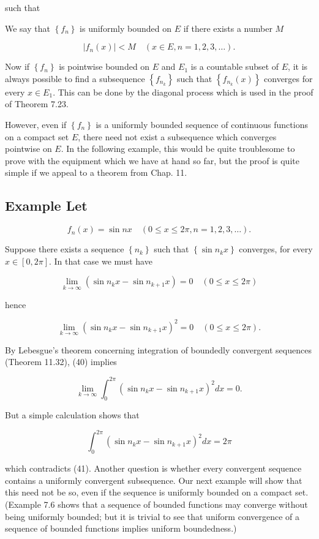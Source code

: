 \documentclass[10pt]{article}
\begin{document}
such that

We say that $\left\{f_{n}\right\}$ is uniformly bounded on $E$ if there exists a number $M$

$$
\left|f_{n}(x)\right|<M \quad(x \in E, n=1,2,3, \ldots) .
$$

Now if $\left\{f_{n}\right\}$ is pointwise bounded on $E$ and $E_{1}$ is a countable subset of $E$, it is always possible to find a subsequence $\left\{f_{n_{k}}\right\}$ such that $\left\{f_{n_{k}}(x)\right\}$ converges for every $x \in E_{1}$. This can be done by the diagonal process which is used in the proof of Theorem 7.23.

However, even if $\left\{f_{n}\right\}$ is a uniformly bounded sequence of continuous functions on a compact set $E$, there need not exist a subsequence which converges pointwise on $E$. In the following example, this would be quite troublesome to prove with the equipment which we have at hand so far, but the proof is quite simple if we appeal to a theorem from Chap. 11.

\subsection{Example Let}
$$
f_{n}(x)=\sin n x \quad(0 \leq x \leq 2 \pi, n=1,2,3, \ldots) .
$$

Suppose there exists a sequence $\left\{n_{k}\right\}$ such that $\left\{\sin n_{k} x\right\}$ converges, for every $x \in[0,2 \pi]$. In that case we must have

$$
\lim _{k \rightarrow \infty}\left(\sin n_{k} x-\sin n_{k+1} x\right)=0 \quad(0 \leq x \leq 2 \pi)
$$

hence

$$
\lim _{k \rightarrow \infty}\left(\sin n_{k} x-\sin n_{k+1} x\right)^{2}=0 \quad(0 \leq x \leq 2 \pi) .
$$

By Lebesgue's theorem concerning integration of boundedly convergent sequences (Theorem 11.32), (40) implies

$$
\lim _{k \rightarrow \infty} \int_{0}^{2 \pi}\left(\sin n_{k} x-\sin n_{k+1} x\right)^{2} d x=0 .
$$

But a simple calculation shows that

$$
\int_{0}^{2 \pi}\left(\sin n_{k} x-\sin n_{k+1} x\right)^{2} d x=2 \pi
$$

which contradicts (41). Another question is whether every convergent sequence contains a uniformly convergent subsequence. Our next example will show that this need not be so, even if the sequence is uniformly bounded on a compact set. (Example 7.6 shows that a sequence of bounded functions may converge without being uniformly bounded; but it is trivial to see that uniform convergence of a sequence of bounded functions implies uniform boundedness.)
\end{document}
